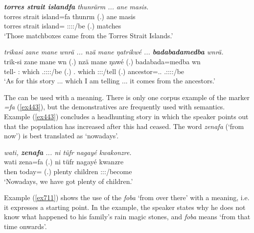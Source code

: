 \begin{exe}
	\ex \emph{\textbf{torres strait islandfa} thunrärm ... ane masis.}\\
	\gll torres strait island=fa thunrm (.) ane masis\\
	torres strait island={\Abl} \Stpl:\Sbj:\Pst:\Dur:\Venit/be (.) {\Dem} matches\\
	\trans `Those matchboxes came from the Torres Strait Islands.'
	\label{ex441}
\end{exe}
\begin{exe}
	\ex \emph{trikasi zane mane wnrä ... nzä mane ŋatrikwé ... \textbf{badabadamedba} wnrä.}\\
	\gll trik-si zane mane wn (.) nzä mane ŋawé (.) badabada=medba wn\\
	tell-{\Nmlz} \Dem:{\Prox} which \Tsg.\F:\Sbj:\Nonpast:\Ipfv:\Venit/be (.) \Fsg.{\Abs} which \Fsg:\Sbj:\Nonpast:\Ipfv/tell (.) ancestor=\Abl.\Anim.{\Nsg} \Tsg.\F:\Sbj:\Nonpast:\Ipfv:\Venit/be\\
	\trans `As for this story ... which I am telling ... it comes from the ancestors.'\\
	\label{ex442}
\end{exe}

\newpage 
The  can be used with a  meaning. There is only one corpus example of the  marker \emph{=fa} (\ref{ex443}), but the  demonstratives are frequently used with  semantics. Example (\ref{ex443}) concludes a headhunting story in which the speaker points out that the population has increased after this had ceased. The word \emph{zenafa} (`from now') is best translated as `nowadays'.
	
\begin{exe}
	\ex \emph{wati, \textbf{zenafa} ... ni tüfr nagayé kwakonzre.}\\
	\gll wati zena=fa (.) ni tüfr nagayé kwanzre\\
	then today={\Abl} (.) {\Fnsg} plenty children \Fpl:\Sbj:\Rpst:\Ipfv/become\\
	\trans `Nowadays, we have got plenty of children.'
	\label{ex443}
\end{exe}

Example (\ref{ex711}) shows the use of the   \emph{foba} `from over there' with a  meaning, i.e. it expresses a starting point. In the example, the speaker states why he does not know what happened to his family's rain magic stones, and \emph{foba} means `from that time onwards'.

